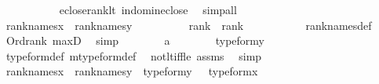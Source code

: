 \begin{isabellebody}
\ \ \ \ \ \ \ \ \isamarkupfalse%
\ \ eclose{\isacharunderscore}{\kern0pt}rank{\isacharunderscore}{\kern0pt}lt\ in{\isacharunderscore}{\kern0pt}dom{\isacharunderscore}{\kern0pt}in{\isacharunderscore}{\kern0pt}eclose\ \isamarkupfalse%
\ simp{\isacharunderscore}{\kern0pt}all\isanewline
\ \ \ \ \ \ \isamarkupfalse%
\ {\isacartoucheopen}rank{\isacharunderscore}{\kern0pt}names{\isacharparenleft}{\kern0pt}x{\isacharparenright}{\kern0pt}\ {\isacharequal}{\kern0pt}\ rank{\isacharunderscore}{\kern0pt}names{\isacharparenleft}{\kern0pt}y{\isacharparenright}{\kern0pt}\ {\isacartoucheclose}\ \isanewline
\ \ \ \ \ \ \isamarkupfalse%
\ {\isachardoublequoteopen}rank{\isacharparenleft}{\kern0pt}{\isacharquery}{\kern0pt}{\isasymtau}{\isacharprime}{\kern0pt}{\isacharparenright}{\kern0pt}\ {\isasymle}\ rank{\isacharparenleft}{\kern0pt}{\isacharquery}{\kern0pt}{\isasymsigma}{\isacharprime}{\kern0pt}{\isacharparenright}{\kern0pt}{\isachardoublequoteclose}\ \isanewline
\ \ \ \ \ \ \ \ \isamarkupfalse%
\ rank{\isacharunderscore}{\kern0pt}names{\isacharunderscore}{\kern0pt}def\ \isamarkupfalse%
\ Ord{\isacharunderscore}{\kern0pt}rank\ max{\isacharunderscore}{\kern0pt}D{}\ \isamarkupfalse%
\ simp\isanewline
\ \ \ \ \ \ \isamarkupfalse%
\ a\isanewline
\ \ \ \ \ \ \isamarkupfalse%
\ {\isachardoublequoteopen}type{\isacharunderscore}{\kern0pt}form{\isacharparenleft}{\kern0pt}y{\isacharparenright}{\kern0pt}\ {\isacharequal}{\kern0pt}\ {}{\isachardoublequoteclose}\isanewline
\ \ \ \ \ \ \ \ \isamarkupfalse%
\ type{\isacharunderscore}{\kern0pt}form{\isacharunderscore}{\kern0pt}def\ mtype{\isacharunderscore}{\kern0pt}form{\isacharunderscore}{\kern0pt}def\ \isamarkupfalse%
\ not{\isacharunderscore}{\kern0pt}lt{\isacharunderscore}{\kern0pt}iff{\isacharunderscore}{\kern0pt}le\ assms\ \isamarkupfalse%
\ simp\isanewline
\ \ \ \ \ \ \isamarkupfalse%
\ {\isacartoucheopen}rank{\isacharunderscore}{\kern0pt}names{\isacharparenleft}{\kern0pt}x{\isacharparenright}{\kern0pt}\ {\isacharequal}{\kern0pt}\ rank{\isacharunderscore}{\kern0pt}names{\isacharparenleft}{\kern0pt}y{\isacharparenright}{\kern0pt}\ {\isacartoucheclose}\ {\isacartoucheopen}type{\isacharunderscore}{\kern0pt}form{\isacharparenleft}{\kern0pt}y{\isacharparenright}{\kern0pt}\ {\isacharequal}{\kern0pt}\ {}{\isacartoucheclose}\ {\isacartoucheopen}type{\isacharunderscore}{\kern0pt}form{\isacharparenleft}{\kern0pt}x{\isacharparenright}{\kern0pt}\ {\isacharequal}{\kern0pt}\ {}{\isacartoucheclose}\isanewline

\end{isabellebody}

